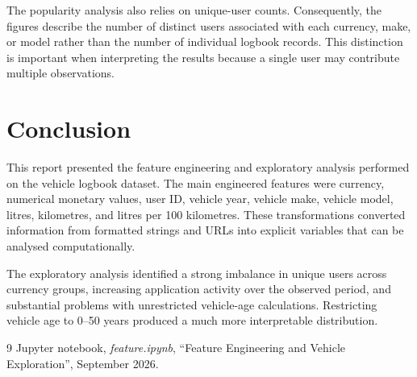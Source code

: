 \documentclass[12pt,a4paper]{article}
\begin{document}
The popularity analysis also relies on unique-user counts. Consequently, the figures describe the number of distinct users associated with each currency, make, or model rather than the number of individual logbook records. This distinction is important when interpreting the results because a single user may contribute multiple observations.


\section{Conclusion}

This report presented the feature engineering and exploratory analysis performed on the vehicle logbook dataset. The main engineered features were currency, numerical monetary values, user ID, vehicle year, vehicle make, vehicle model, litres, kilometres, and litres per 100 kilometres. These transformations converted information from formatted strings and URLs into explicit variables that can be analysed computationally.

The exploratory analysis identified a strong imbalance in unique users across currency groups, increasing application activity over the observed period, and substantial problems with unrestricted vehicle-age calculations. Restricting vehicle age to 0--50 years produced a much more interpretable distribution.


\begin{thebibliography}{9}
Jupyter notebook, \textit{feature.ipynb}, ``Feature Engineering and Vehicle Exploration'', September 2026.
\end{thebibliography}
\end{document}
